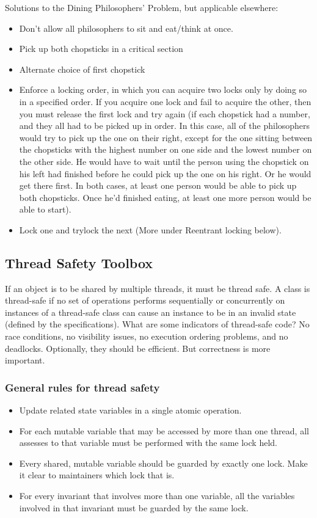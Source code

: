 \documentclass{article}
\begin{document}
Solutions to the Dining Philosophers' Problem, but applicable elsewhere:
\begin{itemize}
    \item Don't allow all philosophers to sit and eat/think at once.
    \item Pick up both chopsticks in a critical section
    \item Alternate choice of first chopstick
    \item Enforce a locking order, in which you can acquire two locks only by doing so in a specified order. If you acquire one lock and fail to acquire the other, then you must release the first lock and try again (if each chopstick had a number, and they all had to be picked up in order. In this case, all of the philosophers would try to pick up the one on their right, except for the one sitting between the chopsticks with the highest number on one side and the lowest number on the other side. He would have to wait until the person using the chopstick on his left had finished before he could pick up the one on his right. Or he would get there first. In both cases, at least one person would be able to pick up both chopsticks. Once he'd finished eating, at least one more person would be able to start).
    \item Lock one and trylock the next (More under Reentrant locking below).
\end{itemize}

\subsection{Thread Safety Toolbox}
If an object is to be shared by multiple threads, it must be thread safe. A class is thread-safe if no set of operations performs sequentially or concurrently on instances of a thread-safe class can cause an instance to be in an invalid state (defined by the specifications). What are some indicators of thread-safe code? No race conditions, no visibility issues, no execution ordering problems, and no deadlocks. Optionally, they should be efficient. But correctness is more important.

\subsubsection{General rules for thread safety}
\begin{itemize}
    \item Update related state variables in a single atomic operation.
    \item For each mutable variable that may be accessed by more than one thread, all assesses to that variable must be performed with the same lock held.
    \item Every shared, mutable variable should be guarded by exactly one lock. Make it clear to maintainers which lock that is.
    \item For every invariant that involves more than one variable, all the variables involved in that invariant must be guarded by the same lock.
\end{itemize}
\end{document}
